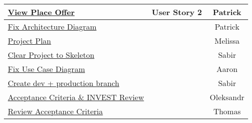 \begin{table}[h]
\begin{tabular}{|l|c|c|}
	\hline
	\href{https://gitlab.rz.uni-bamberg.de/swt/teaching/2021-ws/swt-swl-b/group-a/-/issues/22}{View Place Offer} & User Story 2 & Patrick \\
	\hline
	\href{https://gitlab.rz.uni-bamberg.de/swt/teaching/2021-ws/swt-swl-b/group-a/-/issues/17}{Fix Architecture Diagram} &  & Patrick \\
	\hline
	\href{https://gitlab.rz.uni-bamberg.de/swt/teaching/2021-ws/swt-swl-b/group-a/-/issues/10}{Project Plan} &  & Melissa \\
	\hline
	\href{https://gitlab.rz.uni-bamberg.de/swt/teaching/2021-ws/swt-swl-b/group-a/-/issues/31}{Clear Project to Skeleton} &  & Sabir \\
	\hline
	\href{https://gitlab.rz.uni-bamberg.de/swt/teaching/2021-ws/swt-swl-b/group-a/-/issues/16}{Fix Use Case Diagram} &  & Aaron \\
	\hline
	\href{https://gitlab.rz.uni-bamberg.de/swt/teaching/2021-ws/swt-swl-b/group-a/-/issues/32}{Create dev + production branch} &  & Sabir \\
	\hline
	\href{https://gitlab.rz.uni-bamberg.de/swt/teaching/2021-ws/swt-swl-b/group-a/-/issues/15}{Acceptance Criteria \& INVEST Review} &  & Oleksandr \\
	\hline
	\href{https://gitlab.rz.uni-bamberg.de/swt/teaching/2021-ws/swt-swl-b/group-a/-/issues/36}{Review Acceptance Criteria} &  & Thomas \\
	\hline
\end{tabular}
\end{table}